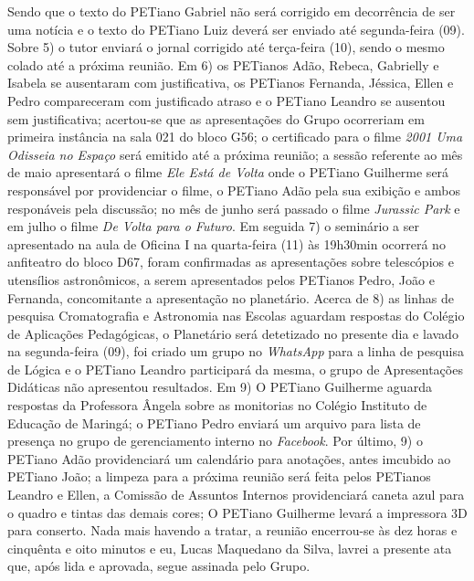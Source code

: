 \documentclass[a4paper,12pt]{report}
\begin{document}
\noindent Sendo que o texto do PETiano Gabriel não será corrigido em decorrência de ser uma notícia e o texto do PETiano Luiz deverá ser enviado até segunda-feira (09).
Sobre 5) o tutor enviará o jornal corrigido até terça-feira (10), sendo o mesmo colado até a próxima reunião.
Em 6) os PETianos Adão, Rebeca, Gabrielly e Isabela se ausentaram com justificativa, os PETianos Fernanda, Jéssica, Ellen e Pedro compareceram com justificado atraso e o PETiano Leandro se ausentou sem justificativa; acertou-se que as apresentações do Grupo ocorreriam em primeira instância na sala 021 do bloco G56; o certificado para o filme {\it 2001 Uma Odisseia no Espaço} será emitido até a próxima reunião; a sessão referente ao mês de maio apresentará o filme {\it Ele Está de Volta} onde o PETiano Guilherme será responsável por providenciar o filme, o PETiano Adão pela sua exibição e ambos responáveis pela discussão; no mês de junho será passado o filme {\it Jurassic Park} e em julho o filme {\it De Volta para o Futuro}.  
Em seguida 7) o seminário a ser apresentado na aula de Oficina I na quarta-feira (11) às 19h30min ocorrerá no anfiteatro do bloco D67, foram confirmadas as apresentações sobre telescópios e utensílios astronômicos, a serem apresentados pelos PETianos Pedro, João e Fernanda, concomitante a apresentação no planetário.
Acerca de 8) as linhas de pesquisa  Cromatografia e Astronomia nas Escolas aguardam respostas do Colégio de Aplicações Pedagógicas, o Planetário  será detetizado no presente dia e lavado na segunda-feira (09), foi criado um grupo no {\it WhatsApp} para a linha de pesquisa de Lógica e o PETiano Leandro participará da mesma, o grupo de Apresentações Didáticas não apresentou resultados.
Em 9) O PETiano Guilherme aguarda respostas da Professora Ângela sobre as monitorias no Colégio Instituto de Educação de Maringá; o PETiano Pedro enviará um arquivo para lista de presença no grupo de gerenciamento interno no {\it Facebook}.
Por último, 9) o PETiano Adão providenciará um calendário para anotações, antes imcubido ao PETiano João; a limpeza para a próxima reunião será feita pelos PETianos Leandro e Ellen, a Comissão de Assuntos Internos providenciará caneta azul para o quadro e tintas das demais cores; O PETiano Guilherme levará a impressora 3D para conserto.
Nada mais havendo a tratar, a reunião encerrou-se às dez horas e cinquênta e oito minutos e eu, Lucas Maquedano da Silva, lavrei a presente ata que, após lida e aprovada, segue assinada pelo Grupo. 
 
 
\vfill 
\end{document}
